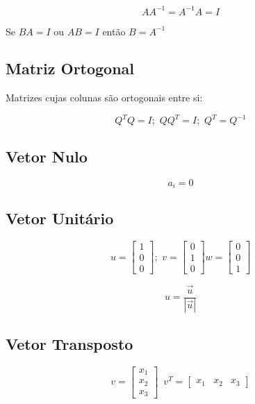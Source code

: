 \[ AA^{-1} = A^{-1}A = I \]

Se $BA = I$ ou $AB = I$ então $B = A^{-1}$

\subsection{Matriz Ortogonal}

Matrizes cujas colunas são ortogonais entre si:

\[ Q^{T}Q = I;\,\, QQ^{T} = I;\,\, Q^{T} = Q^{-1} \]

\subsection{Vetor Nulo}

\[ a_{i} = 0 \]

\subsection{Vetor Unitário}

\[
  u = \left[
    \begin{array}{c}
      1 \\
      0 \\
      0 
    \end{array}
    \right];\,\,
  v = \left[
    \begin{array}{c}
      0 \\
      1 \\
      0 
    \end{array}
    \right]
  w = \left[
    \begin{array}{c}
      0 \\
      0 \\
      1 
    \end{array}
    \right]
\]

\[
u = \frac{\vec{u}}{|\vec{u}|}
\]

\subsection{Vetor Transposto}

\[
  v = \left[
    \begin{array}{c}
      x_1 \\
      x_2 \\
      x_3 
    \end{array}
    \right]
\,\,\,
  v^T = \left[
    \begin{array}{ccc}
      x_1 & x_2 & x_3 
    \end{array}
    \right]
\]

